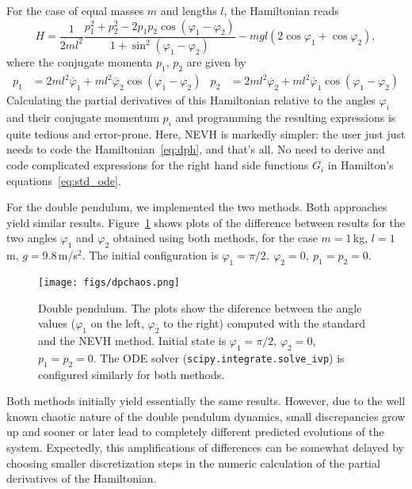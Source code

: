 \documentclass{iopart}
\begin{document}
For the case of equal masses $m$ and lengths $l$, the Hamiltonian
reads~\cite{bohm:2018}
\begin{equation}\label{eq:dph}
  H=\frac{1}{2ml^2}
  \frac{p_1^2 + p_2^2-2p_1p_2\cos(\varphi_1-\varphi_2)}%
    {1+\sin^2(\varphi_1-\varphi_2)}-
    mgl(2\cos\varphi_1+\cos\varphi_2),
\end{equation}
where the conjugate momenta $p_1$, $p_2$ are given by
\begin{align}
  p_1&=2ml^2\dot{\varphi_1}+ml^2\dot{\varphi_2}\cos(\varphi_1-\varphi_2)&
  p_2&=2ml^2\dot{\varphi_2}+ml^2\dot{\varphi_1}\cos(\varphi_1-\varphi_2)
\end{align}
Calculating the partial derivatives of this Hamiltonian relative to the angles
$\varphi_i$ and their conjugate momentum $p_i$ and programming the resulting
expressions is quite tedious and error-prone. Here, NEVH is markedly
simpler: the user just just needs to code the Hamiltonian~\eqref{eq:dph}, and
that's all. No need to derive and code complicated expressions for the right
hand side functions $G_i$ in Hamilton's equations~\eqref{eq:std_ode}.

For the double pendulum, we implemented the two methods.  Both approaches yield
similar results. Figure~\ref{fig:c} shows plots of the difference between
results for the two angles $\varphi_1$ and $\varphi_2$ obtained using both
methods, for the case $m=1$\,kg, $l=1$\,m, $g=9.8$\,m/s$^2$. The initial
configuration is $\varphi_1=\pi/2,\ \varphi_2=0,\ p_1=p_2=0$.
\begin{figure}[htb]
  {\centering
    \texttt{[image: figs/dpchaos.png]}
    \caption{\label{fig:c}Double pendulum. The plots show the diference between
    the angle values ($\varphi_1$ on the left, $\varphi_2$ to the right)
    computed with the standard and the NEVH method. Initial state is
    $\varphi_1=\pi/2$, $\varphi_2=0$, $p_1=p_2=0$. The ODE solver
    (\texttt{scipy.integrate.solve\_ivp}) is configured similarly for both
  methods.}
  }\par
\end{figure}
Both methods initially yield essentially the same results. However, due to the
well known chaotic nature of the double pendulum dynamics, small discrepancies
grow up and sooner or later lead to completely different predicted evolutions of
the system.  Expectedly, this amplifications of differences can be somewhat
delayed by choosing smaller discretization steps in the numeric calculation of
the partial derivatives of the Hamiltonian.
\end{document}
